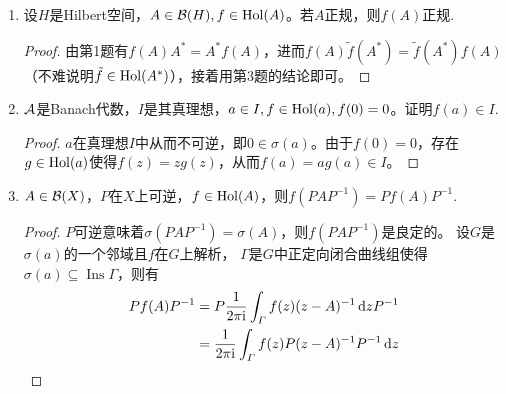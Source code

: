 \begin{enumerate}
\begin{proof}
        任取$x,y\in H$，有
        \begin{align*}
            \langle f(A)x,y \rangle&=\frac{1}{2\pi{\rm i}}\int_\varGamma f(z)\langle (z-A)^{-1}x,y \rangle\,{\rm d}z\\
            &=\frac{1}{2\pi{\rm i}}\int_\varGamma f(z)\langle x,(\bar{z}-A^*)^{-1}y \rangle\,{\rm d}z\\
            &=\frac{1}{2\pi{\rm i}}\int_\varGamma f(\bar{z})\langle x,(z-A^*)^{-1}y \rangle\,{\rm d}\bar{z}\\
            &=-\frac{1}{2\pi{\rm i}}\int_{\varGamma^*} f(\bar{z})\langle x,(z-A^*)^{-1}y \rangle\,{\rm d}z \quad (\text{负号是因为 $\varGamma$ 的正定向共轭后是 $\varGamma^*$ 的负定向})\\
            &=-\frac{1}{2\pi{\rm i}}\overline{\int_{\varGamma^*} \tilde{f}(z)\langle (z-A^*)^{-1}y,x \rangle\,{\rm d}z}\\
            &=\overline{\langle \tilde{f}(A^*)y,x\rangle}=\langle x,\tilde{f}(A^*)y\rangle.
        \end{align*}
    \end{proof}
    \item 设$H$是Hilbert空间，$A\in\mathcal{B}(H),f\in\mathrm{Hol}(A)$。若$A$正规，则$f(A)$正规.
    \begin{proof}
        由第1题有$f(A)A^*=A^*f(A)$，进而$f(A)\tilde{f}(A^*)=\tilde{f}(A^*)f(A)$（不难说明$\tilde{f}\in\mathrm{Hol}(A^*)$），接着用第3题的结论即可。
    \end{proof}
    \item $\mathcal{A}$是Banach代数，$I$是其真理想，$a\in I,f\in\mathrm{Hol}(a),f(0)=0$。证明$f(a)\in I$.
    \begin{proof}
        $a$在真理想$I$中从而不可逆，即$0\in\sigma(a)$。由于$f(0)=0$，存在$g\in\mathrm{Hol}(a)$使得$f(z)=zg(z)$，从而$f(a)=ag(a)\in I$。
    \end{proof}
    \item $A\in\mathcal{B}(X)$，$P$在$X$上可逆，$f\in\mathrm{Hol}(A)$，则$f(PAP^{-1})=Pf(A)P^{-1}$.
    \begin{proof}
        $P$可逆意味着$\sigma(PAP^{-1})=\sigma(A)$，则$f(PAP^{-1})$是良定的。
        设$G$是$\sigma(a)$的一个邻域且$f$在$G$上解析，
        $\varGamma$是$G$中正定向闭合曲线组使得$\sigma(a)\subseteq\operatorname{Ins}\varGamma$，则有
        \begin{align*}
            Pf(A)P^{-1}&=P\frac{1}{2\pi{\rm i}}\int_{\varGamma}f(z)(z-A)^{-1}\,{\rm d}zP^{-1}\\
            &=\frac{1}{2\pi{\rm i}}\int_{\varGamma}f(z)P(z-A)^{-1}P^{-1}\,{\rm d}z\\

\end{align*}
\end{proof}
\end{enumerate}
